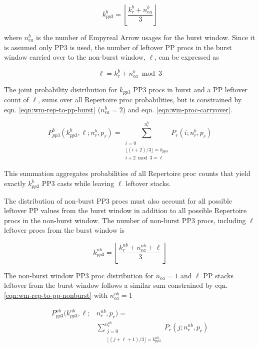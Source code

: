 \begin{equation}
    k^b_{pp3} = \left\lfloor \frac{k^b_r + n_{ea}^b }{3} \right\rfloor \label{eqn:wm-rep-to-pp-burst}
\end{equation}

where $n^b_{ea}$ is the number of Empyreal Arrow usages for the burst window. Since it is assumed only PP3 is used, the number of leftover PP procs in the burst window carried over to the non-burst window, $\ell$, can be expressed as

\begin{equation}
    \ell = k^b_r + n_{ea}^b \bmod 3
    \label{eqn:wm-proc-carryover}
\end{equation}

The joint probability distribution for $k_{pp3}$ PP3 procs in burst and a PP leftover count of $\ell$, sums over all Repertoire proc probabilities, but is constrained by eqn. \ref{eqn:wm-rep-to-pp-burst} ($n_{ea}^b = 2$) and eqn. \ref{eqn:wm-proc-carryover}.

\begin{equation}
    P^b_{pp3}(k^b_{pp3}, \ell; n^b_r, p_r) = 
    \sum_{\substack{i = 0 \\ \lfloor (i + 2) / 3 \rfloor = k_{pp3} \\ i + 2 \bmod 3 = \ell}}^{n_r^b}
    P_r(i; n_r^b, p_r)
\end{equation}

This summation aggregates probabilities of all Repertoire proc counts that yield exactly $k^b_{pp3}$ PP3 casts while leaving $\ell$ leftover stacks.

The distribution of non-burst PP3 procs must also account for all possible leftover PP values from the burst window in addition to all possible Repertoire procs in the non-burst window. The number of non-burst PP3 procs, including $\ell$ leftover procs from the burst window is

\begin{equation}
    k^{nb}_{pp3} = \left\lfloor \frac{k^{nb}_r + n_{ea}^{nb} + \ell}{3} \right\rfloor 
    \label{eqn:wm-rep-to-pp-nonburst}
\end{equation}

The non-burst window PP3 proc distribution for $n_{ea} = 1$ and $\ell$ PP stacks leftover from the burst window follows a similar sum constrained by eqn. \ref{eqn:wm-rep-to-pp-nonburst} with $n_{ea}^{nb} = 1$

\begin{equation}
\begin{split}
P^{nb}_{pp3}(k_{pp3}^{nb}, \ell; &n_{r}^{nb}, p_r) = \\
&\sum_{\substack{j = 0 \\ \lfloor (j + \ell + 1)/3\rfloor = k_{pp3}^{nb}}}^{n_r^{nb}}
P_r(j;n^{nb}_r, p_r)
\end{split}
\end{equation}

